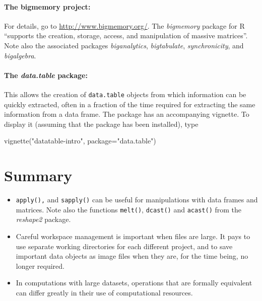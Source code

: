 \documentclass{tufte-book}\usepackage[]{graphicx}\usepackage[]{color}
\newcommand{\txtt}[1]{\texttt{#1}}
\begin{document}
\paragraph{The bigmemory project:} For details, go to
\url{http://www.bigmemory.org/}. The {\em bigmemory} package for R
``supports the creation, storage, access, and manipulation of massive
matrices''. Note also the associated packages {\em biganalytics}, {\em bigtabulate},
{\em synchronicity}, and {\em bigalgebra}.

\paragraph{The \textit{data.table} package:}
This allows the creation
of \txtt{data.table} objects from which information can be quickly
extracted, often in a fraction of the time required for extracting the
same information from a data frame.  The package has an accompanying
vignette.  To display it (assuming that the package has been
installed), type
\begin{Schunk}
\begin{Sinput}
vignette("datatable-intro", package="data.table")
\end{Sinput}
\end{Schunk}

\section{Summary}
\begin{itemize}
\item[] \txtt{apply(),} and \txtt{sapply()} can be useful for
  manipulations with data frames and matrices.  Note also the
  functions \txtt{melt()}, \txtt{dcast()} and \txtt{acast()} from the
  \textit{reshape2} package.

\item[] Careful workspace management is important when files
are large.  It pays to use separate working directories for each
different project, and to save important data objects as image files
when they are, for the time being, no longer required.

\item[] In computations with large datasets, operations that
are formally equivalent can differ greatly in their use of
computational resources.

\end{itemize}
\cleartooddpage
\end{document}

